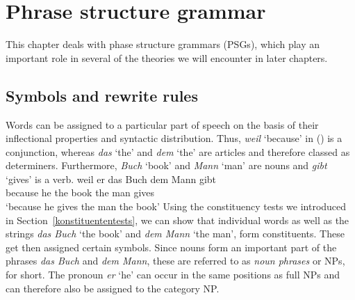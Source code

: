 
\chapter{Phrase structure grammar}
\label{Kapitel-PSG}

This chapter deals with phase structure grammars (PSGs), which play an important role in several of the theories we will encounter in later chapters.

\section{Symbols and rewrite rules}

Words can be assigned to a particular part of speech on the basis of their inflectional properties
and syntactic distribution. Thus, \emph{weil} `because' in ()
is a conjunction, whereas \emph{das} `the' and \emph{dem} `the' are
articles and therefore classed as determiners. Furthermore, \emph{Buch} `book' and \emph{Mann} `man' are nouns 
and \emph{gibt} `gives' is a verb.
\ea\label{bsp-weil-er-das-buch-dem-mann-gibt}
\gll weil er das Buch dem Mann gibt\\
	 because he the book the man gives\\
\glt `because he gives the man the book'
\z
Using the constituency tests we introduced in Section~\ref{konstituententests}, we can show that
individual words as well as the strings \emph{das Buch} `the book' and \emph{dem Mann} `the man',
form constituents. These get then assigned certain symbols. Since nouns form an important part of
the phrases \emph{das Buch} and \emph{dem Mann}, these are referred to as \emph{noun phrases} or
NPs, for short. The pronoun \emph{er} `he' can occur in the same positions as full NPs and can
therefore also be assigned to the category NP.


